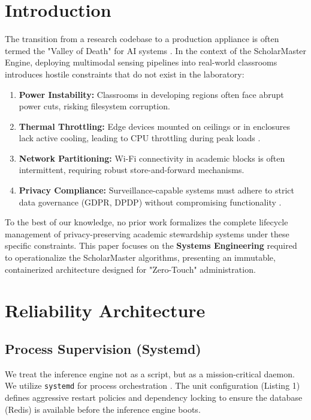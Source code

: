\documentclass[conference]{IEEEtran}
\begin{document}
\section{Introduction}
The transition from a research codebase to a production appliance is often termed the "Valley of Death" for AI systems \cite{b11}. In the context of the ScholarMaster Engine, deploying multimodal sensing pipelines into real-world classrooms introduces hostile constraints that do not exist in the laboratory:
\begin{enumerate}
    \item \textbf{Power Instability:} Classrooms in developing regions often face abrupt power cuts, risking filesystem corruption.
    \item \textbf{Thermal Throttling:} Edge devices mounted on ceilings or in enclosures lack active cooling, leading to CPU throttling during peak loads \cite{b12}.
    \item \textbf{Network Partitioning:} Wi-Fi connectivity in academic blocks is often intermittent, requiring robust store-and-forward mechanisms.
    \item \textbf{Privacy Compliance:} Surveillance-capable systems must adhere to strict data governance (GDPR, DPDP) without compromising functionality \cite{b9}.
\end{enumerate}

To the best of our knowledge, no prior work formalizes the complete lifecycle management of privacy-preserving academic stewardship systems under these specific constraints. This paper focuses on the \textbf{Systems Engineering} required to operationalize the ScholarMaster algorithms, presenting an immutable, containerized architecture designed for "Zero-Touch" administration.

\section{Reliability Architecture}

\subsection{Process Supervision (Systemd)}
We treat the inference engine not as a script, but as a mission-critical daemon. We utilize \texttt{systemd} for process orchestration \cite{b3}. The unit configuration (Listing 1) defines aggressive restart policies and dependency locking to ensure the database (Redis) is available before the inference engine boots.
\end{document}
